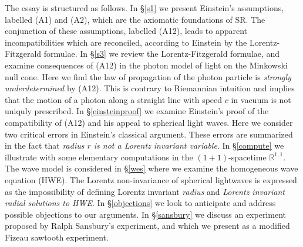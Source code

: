 \documentclass[12pt]{article}
\newcommand{\bR}{\mathbb{R}}
\begin{document}



The essay is structured as follows. In \S \ref{s1} we present Einstein's assumptions, labelled (A1) and (A2), which are the axiomatic foundations of SR. The conjunction of these assumptions, labelled (A12), leads to apparent incompatibilities which are reconciled, according to Einstein by the Lorentz-Fitzgerald formulae. In \S \ref{s3} we review the Lorentz-Fitzgerald formulae, and examine consequences of (A12) in the photon model of light on the Minkowski null cone. Here we find the law of propagation of the photon particle is \emph{strongly underdetermined} by (A12). This is contrary to Riemannian intuition and implies that the motion of a photon along a straight line with speed $c$ in vacuum is not uniquly prescribed. In \S \ref{einsteinproof} we examine Einstein's proof of the compatibility of (A12) and his appeal to spherical light waves. Here we consider two critical errors in Einstein's classical argument. These errors are summarized in the fact that \emph{radius $r$ is not a Lorentz invariant variable}. In \S \ref{compute} we illustrate with some elementary computations in the $(1+1)$-spacetime $\bR^{1,1}$. The wave model is considered in \S \ref{wes} where we examine the homogeneous wave equation (HWE). The Lorentz non-invariance of spherical lightwaves is expressed as the impossibility of defining Lorentz invariant \emph{radius} and \emph{Lorentz invariant radial solutions to HWE}. In \S \ref{objections} we look to anticipate and address possible objections to our arguments. In \S \ref{sansbury} we discuss an experiment proposed by Ralph Sansbury's experiment, and which we present as a modified Fizeau sawtooth experiment.




\end{document}

